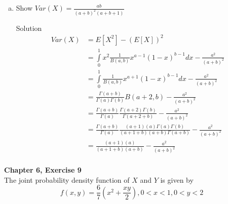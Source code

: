 \documentclass{article}
\begin{document}
\begin{spacing}{1.1}
\begin{homeworkProblem}
\begin{enumerate}[(a)]
\begin{homeworkSection}{Solution}
\begin{align*}
            \frac{ \Gamma( a + 1) \Gamma( b)}{ \Gamma( a + 1 + b)} \\
          &= \frac{ \Gamma( a + b)}{ \Gamma( a)} 
            \frac{ \Gamma( a + 1)}{ \Gamma( a + 1 + b)} \\
          &= \frac{ \Gamma( a + b)}{ \Gamma( a)} 
            \frac{ a\Gamma( a)}{ (a + b)\Gamma( a + b)} \\
          &= \frac{ a}{ (a + b)} \\
        \end{align*}
      \end{homeworkSection}
    \item Show $Var( X) = \frac{ ab}{ (a + b)^2 (a + b + 1)}$
      \begin{homeworkSection}{Solution}
        \begin{align*}
          Var( X) &= E[ X^2] - (E[ X])^2\\
          &= \int\limits_0^1 x^2 \frac{ 1}{ B(a, b)} x^{a - 1} (1 - x)^{b - 1} dx 
            - \frac{ a^2}{ (a + b)^2}\\
          &= \int\limits_0^1 \frac{ 1}{ B(a, b)} x^{a + 1} (1 - x)^{b - 1} dx 
            - \frac{ a^2}{ (a + b)^2}\\
          &= \frac{ \Gamma( a + b)}{ \Gamma( a) \Gamma( b)} B(a + 2, b)
            - \frac{ a^2}{ (a + b)^2}\\
          &= \frac{ \Gamma( a + b)}{ \Gamma( a)}
            \frac{ \Gamma( a + 2) \Gamma( b)}{ \Gamma( a + 2 + b)}
            - \frac{ a^2}{ (a + b)^2}\\
          &= \frac{ \Gamma( a + b)}{ \Gamma( a) }
            \frac{ (a + 1) (a) \Gamma( a) \Gamma( b)}{ ( a + 1 + b)( a + b)\Gamma( a + b)}
            - \frac{ a^2}{ (a + b)^2}\\
          &= \frac{ (a + 1) (a)}{ ( a + 1 + b)( a + b)}
            - \frac{ a^2}{ (a + b)^2}\\
        \end{align*}
      \end{homeworkSection}
  \end{enumerate}
\end{homeworkProblem}

\newpage
\begin{homeworkProblem}
  {\bf Chapter 6, Exercise 9}\\
  The joint probability density function of $X$ and $Y$ is given by
  \[f( x, y) = \frac{ 6}{ 7} \left( x^2 + \frac{ x y}{ 2}\right), 
    0 < x < 1, 0 < y < 2\]


\end{homeworkProblem}
\end{spacing}
\end{document}
